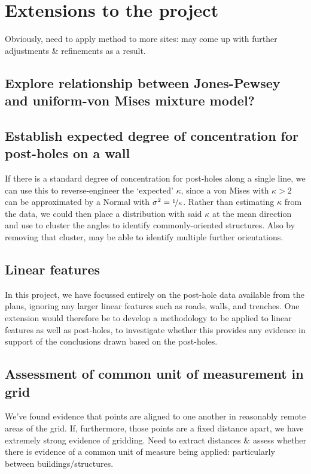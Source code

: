 \documentclass[../../ArchStats.tex]{subfiles}
\begin{document}
\section{Extensions to the project}

Obviously, need to apply method to more sites: may come up with further adjustments \& refinements as a result.

\subsection{Explore relationship between Jones-Pewsey and uniform-von Mises mixture model?}


\subsection{Establish expected degree of concentration for post-holes on a wall}
If there is a standard degree of concentration for post-holes along a single line, we can use this to reverse-engineer the `expected' $\kappa$, since a von Mises with $\kappa > 2$ can be approximated by a Normal with $\sigma^2 = \nicefrac{1}{\kappa}$. Rather than estimating $\kappa$ from the data, we could then place a distribution with said $\kappa$ at the mean direction and use to cluster the angles to identify commonly-oriented structures. Also by removing that cluster, may be able to identify multiple further orientations.

\subsection{Linear features}
In this project, we have focussed entirely on the post-hole data available from the plans, ignoring any larger linear features such as roads, walls, and trenches. One extension would therefore be to develop a methodology to be applied to linear features as well as post-holes, to investigate whether this provides any evidence in support of the conclusions drawn based on the post-holes.

\subsection{Assessment of common unit of measurement in grid}
We've found evidence that points are aligned to one another in reasonably remote areas of the grid. If, furthermore, those points are a fixed distance apart, we have extremely strong evidence of gridding. Need to extract distances \& assess whether there is evidence of a common unit of measure being applied: particularly between buildings/structures.
\end{document}
